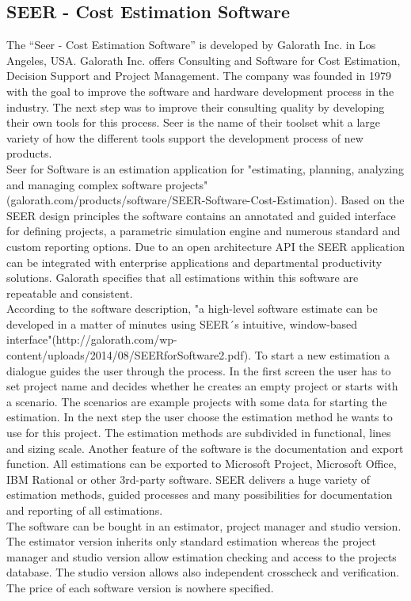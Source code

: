 \subsection{SEER - Cost Estimation Software}

The “Seer - Cost Estimation Software” is developed by Galorath Inc. in Los Angeles, USA. Galorath Inc. offers Consulting and Software for Cost Estimation, Decision Support and Project Management. The company was founded in 1979 with the goal to improve the software and hardware development process in the industry. The next step was to improve their consulting quality by developing their own tools for this process. Seer is the name of their toolset whit a large variety of how the different tools support the development process of new products.
\\
Seer for Software is an estimation application for "estimating, planning, analyzing and managing complex software projects" (galorath.com/products/software/SEER-Software-Cost-Estimation). Based on the SEER design principles the software contains an annotated and guided interface for defining projects, a parametric simulation engine and numerous standard and custom reporting options. Due to an open architecture API the SEER application can be integrated with enterprise applications and departmental productivity solutions. Galorath specifies that all estimations within this software are repeatable and consistent.
\\
According to the software description, "a high-level software estimate can be developed in a matter of minutes using SEER´s intuitive, window-based interface"(http://galorath.com/wp-content/uploads/2014/08/SEERforSoftware2.pdf). To start a new estimation a dialogue guides the user through the process. In the first screen the user has to set project name and decides whether he creates an empty project or starts with a scenario. The scenarios are example projects with some data for starting the estimation. In the next step the user choose the estimation method he wants to use for this project. The estimation methods are subdivided in functional, lines and sizing scale. Another feature of the software is the documentation and export function. All estimations can be exported to Microsoft Project, Microsoft Office, IBM Rational or other 3rd-party software. SEER delivers a huge variety of estimation methods, guided processes and many possibilities for documentation and reporting of all estimations.
\\
The software can be bought in an estimator, project manager and studio version. The estimator version inherits only standard estimation whereas the project manager and studio version allow estimation checking and access to the projects database. The studio version allows also independent crosscheck and verification. The price of each software version is nowhere specified.

